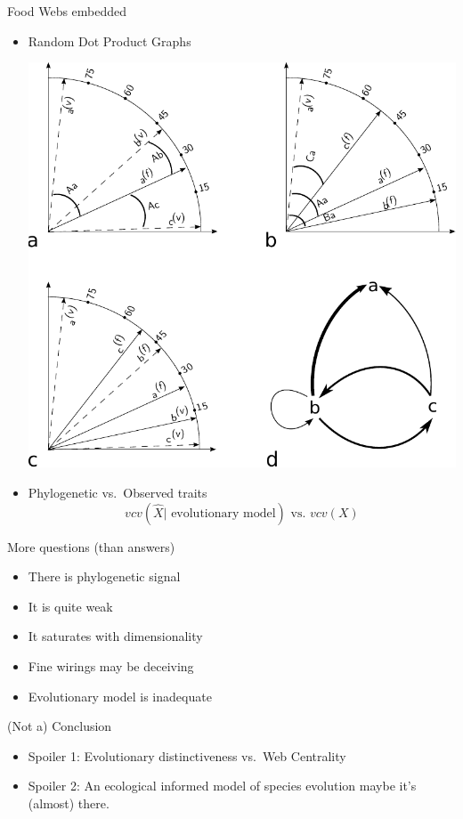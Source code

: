 \documentclass[ignorenonframetext,]{beamer}
\begin{document}
\begin{frame}{Food Webs embedded}

\begin{itemize}[<+->]
\centering
\item
Random Dot Product Graphs

  \includegraphics[width=0.4\linewidth]{images/RDPGmodel.pdf}

\item
Phylogenetic vs.~Observed traits
  \begin{equation*}
    vcv\left( \hat{X} | \mbox{ evolutionary model} \right) \mbox{ vs. } vcv\left(X\right)
  \end{equation*}

\end{itemize}

\end{frame}

\begin{frame}{More questions (than answers)}

\begin{itemize}[<+->]
\itemsep1pt\parskip0pt
\item
  There is phylogenetic signal
\item
  It is quite weak
\item
  It saturates with dimensionality
\item
  Fine wirings may be deceiving
\item
  Evolutionary model is inadequate
\end{itemize}

\end{frame}

\begin{frame}{(Not a) Conclusion}

\begin{itemize}[<+->]
\item
  Spoiler 1: Evolutionary distinctiveness vs.~Web Centrality
\item
  Spoiler 2: An ecological informed model of species evolution maybe
  it's (almost) there.
\end{itemize}

\end{frame}
\end{document}
